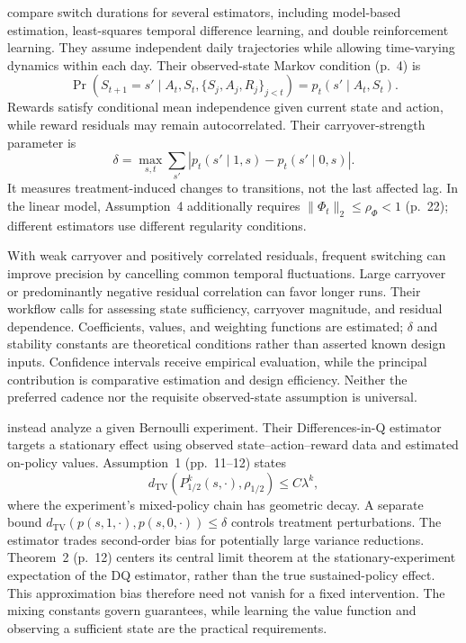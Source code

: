 \citet{wen2025} compare switch durations for several estimators, including model-based estimation, least-squares temporal difference learning, and double reinforcement learning. They assume independent daily trajectories while allowing time-varying dynamics within each day. Their observed-state Markov condition (p.~4) is
\begin{equation}
 \Pr(S_{t+1}=s'\mid A_t,S_t,\{S_j,A_j,R_j\}_{j<t})
 =p_t(s'\mid A_t,S_t).
\end{equation}
Rewards satisfy conditional mean independence given current state and action, while reward residuals may remain autocorrelated. Their carryover-strength parameter is
\begin{equation}
 \delta=\max_{s,t}\sum_{s'}
 |p_t(s'\mid1,s)-p_t(s'\mid0,s)|.
\end{equation}
It measures treatment-induced changes to transitions, not the last affected lag. In the linear model, Assumption~4 additionally requires $\lVert\Phi_t\rVert_2\leq\rho_\Phi<1$ (p.~22); different estimators use different regularity conditions.

With weak carryover and positively correlated residuals, frequent switching can improve precision by cancelling common temporal fluctuations. Large carryover or predominantly negative residual correlation can favor longer runs. Their workflow calls for assessing state sufficiency, carryover magnitude, and residual dependence. Coefficients, values, and weighting functions are estimated; $\delta$ and stability constants are theoretical conditions rather than asserted known design inputs. Confidence intervals receive empirical evaluation, while the principal contribution is comparative estimation and design efficiency. Neither the preferred cadence nor the requisite observed-state assumption is universal.

\citet{farias2022} instead analyze a given Bernoulli experiment. Their Differences-in-Q estimator targets a stationary effect using observed state--action--reward data and estimated on-policy values. Assumption~1 (pp.~11--12) states
\begin{equation}
 d_{\mathrm{TV}}(P_{1/2}^{k}(s,\cdot),\rho_{1/2})
 \leq C\lambda^k,
\end{equation}
where the experiment's mixed-policy chain has geometric decay. A separate bound $d_{\mathrm{TV}}(p(s,1,\cdot),p(s,0,\cdot))\leq\delta$ controls treatment perturbations. The estimator trades second-order bias for potentially large variance reductions. Theorem~2 (p.~12) centers its central limit theorem at the stationary-experiment expectation of the DQ estimator, rather than the true sustained-policy effect. This approximation bias therefore need not vanish for a fixed intervention. The mixing constants govern guarantees, while learning the value function and observing a sufficient state are the practical requirements.

